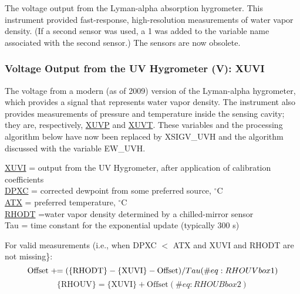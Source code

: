 \documentclass[
  english,
]{book}
\begin{document}
The voltage output from the Lyman-alpha absorption hygrometer. This
instrument provided fast-response, high-resolution measurements of water
vapor density. (If a second sensor was used, a 1 was added to the
variable name associated with the second sensor.) The sensors are now
obsolete.

\hypertarget{xuvi}{%
\subsubsection*{Voltage Output from the UV Hygrometer (V):
XUVI}\label{xuvi}}

The voltage from a modern (as of 2009) version of the Lyman-alpha
hygrometer, which provides a signal that represents water vapor density.
The instrument also provides measurements of pressure and temperature
inside the sensing cavity; they are, respectively, \underline{XUVP} and
\underline{XUVT}. These variables and the processing algorithm below
have now been replaced by XSIGV\_UVH and the algorithm discussed with
the variable EW\_UVH.

\newcommand{\pluseq}{\mathrel{+}\mathrel{\mkern-1mu}=}

\protect\hyperlink{xuvi}{XUVI} = output from the UV Hygrometer, after
application of calibration coefficients\\
\href{./4-the-state-of-the-atmosphere.html\#dewpt-corrected}{DPXC}
= corrected dewpoint from some preferred source, \(^{\circ}\)C\\
\href{./4-the-state-of-the-atmosphere.html\#ambient-t}{ATX} =
preferred temperature, \(^{\circ}\)C\\
\href{./4-the-state-of-the-atmosphere.html\#rho}{RHODT}
=water vapor density determined by a chilled-mirror sensor\\
Tau = time constant for the exponential update (typically 300 s)

For valid measurements (i.e., when DPXC \(<\) ATX and XUVI and RHODT are
not missing\}:\\
\begin{equation}
\mathrm{Offset}\mathrel{+}\mathrel{\mkern-1mu}=(\mathrm{\{RHODT\}-\{XUVI\}-Offset})/Tau
(\#eq:RHOUVbox1)
\end{equation} \begin{equation}
\mathrm{\{RHOUV\} = \{XUVI\} + Offset}
(\#eq:RHOUBbox2)
\end{equation}
\end{document}
